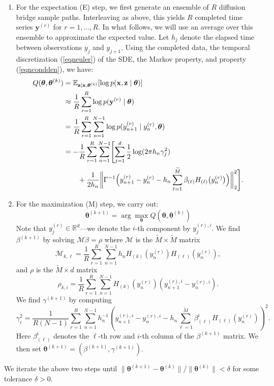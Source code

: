\documentclass{article}
\newcommand{\btheta}{\ensuremath{\bm{\theta}}}
\newcommand{\bx}{\ensuremath{\mathbf{x}}}
\newcommand{\by}{\ensuremath{\mathbf{y}}}
\newcommand{\bz}{\ensuremath{\mathbf{z}}}
\begin{document}
\begin{enumerate}
\item For the expectation (E) step, we first generate an ensemble of $R$ diffusion bridge sample paths.  Interleaving as above, this yields $R$ completed time series $\by^{(r)}$ for $r = 1, \ldots, R$.  In what follows, we will use an average over this ensemble to approximate the expected value.  Let $h_j$ denote the elapsed time between observations $y_j$ and $y_{j+1}$.  Using the completed data, the temporal discretization (\ref{eqneuler}) of the SDE, the Markov property, and property (\ref{eqncondden}), we have:
\begin{align}
\label{eqnqfun}
Q(\btheta, \btheta^{(k)}) &= \mathbb{E}_{\bz \mid \bx, \btheta^{(k)}} [\log p(\bx, \bz \mid \btheta)] \\
 &\approx \frac{1}{R} \sum_{r=1}^R \log p(\by^{(r)} \mid \btheta) \nonumber \\
 &= \frac{1}{R} \sum_{r=1}^R \sum_{n=1}^{N-1} \log p(y_{n+1}^{(r)} \mid y_n^{(r)}, \btheta) \nonumber \\
 &= -\frac{1}{R} \sum_{r=1}^R \sum_{n=1}^{N-1} \Biggl[ \sum_{j=1}^d \frac{1}{2} \log(2 \pi h_n \gamma_j^2) \nonumber \\
 &\qquad + \frac{1}{2h_n} \biggl\| \Gamma^{-1} \Bigl(y_{n+1}^{(r)} - y_n^{(r)} - h_n \sum_{\ell=1}^{\widetilde{M}} \beta_{(\ell)} H_{(\ell)}\bigl(y_n^{(r)}\bigr)\Bigr) \biggr\|_2^2 \Biggr].
\end{align}
\item For the maximization (M) step, we carry out:
\begin{equation*}
\btheta^{(k+1)} = \arg \max_{\btheta} Q( \btheta, \btheta^{(k)}) 
\end{equation*}
Note that $y_j^{(r)} \in \mathbb{R}^d$---we denote the $i$-th component by $y_j^{(r),i}$.  We find $\beta^{(k+1)}$ by solving $\mathcal{M} \beta = \rho$ where $\mathcal{M}$ is the $\widetilde{M} \times \widetilde{M}$ matrix
\begin{equation}
\label{eqnestM}
\mathcal{M}_{k,\ell} = \frac{1}{R} \sum_{r=1}^{R} \sum_{n=1}^{N-1} h_n H_{(k)} (y_{n}^{(r)}) H_{(\ell)} (y_{n}^{(r)}),
\end{equation}
and $\rho$ is the $\widetilde{M} \times d$ matrix
\begin{equation}
\label{eqnestrho}
\rho_{k, i} = \frac{1}{R} \sum_{r=1}^{R} \sum_{n=1}^{N-1} H_{(k)} (y_{n}^{(r)}) (y_{n+1}^{(r), i} - y_{n}^{(r), i}).
\end{equation}
We find $\gamma^{(k+1)}$ by computing
\begin{equation}
\label{eqnestgamma}
\gamma_i^2 = \frac{1}{R (N-1)} \sum_{r=1}^{R} \sum_{n=1}^{N-1} h_n^{-1} ( y_{n+1}^{(r), i} - y_{n}^{(r), i} - h_n \sum_{\ell=1}^{\widetilde{M}} \beta_{(\ell)}^i H_{(\ell)} (y_{n}^{(r)}) )^2.
\end{equation}
Here $\beta_{(\ell)}^i$ denotes the $\ell$-th row and $i$-th column of the $\beta^{(k+1)}$ matrix.  We then set $\btheta^{(k+1)} = (\beta^{(k+1)}, \gamma^{(k+1)})$.
\end{enumerate}
We iterate the above two steps until $\| \btheta^{(k+1)} - \btheta^{(k)} \|/\| \btheta^{(k)} \| < \delta$ for some tolerance $\delta > 0$.
\end{document}
